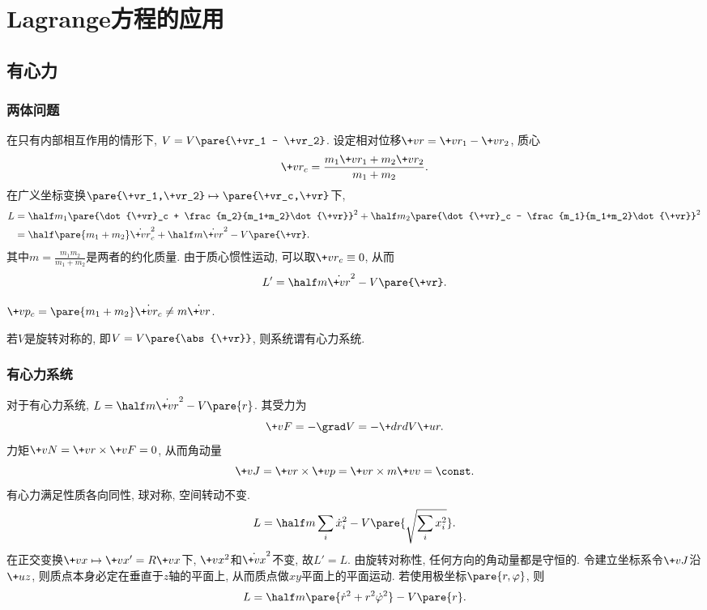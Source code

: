 \documentclass{ctexart}
\begin{document}
\section{Lagrange方程的应用} %
\label{sec:lagrange方程的应用}

\subsection{有心力} %
\label{sub:有心力}

\subsubsection{两体问题} %
\label{ssub:两体问题}

\begin{figure}[ht]
    \centering
\end{figure}
在只有内部相互作用的情形下, $V = V\pare{\+vr_1 - \+vr_2}$. 设定相对位移$\+vr = \+vr_1 - \+vr_2$, 质心
\[ \+vr_c = \frac{m_1\+vr_1 + m_2\+vr_2}{m_1+m_2}. \]
在广义坐标变换$\pare{\+vr_1,\+vr_2}\mapsto \pare{\+vr_c,\+vr}$下,
\begin{align*}
    L &= \half m_1\pare{\dot{\+vr}_c + \frac{m_2}{m_1+m_2}\dot{\+vr}}^2 + \half m_2 \pare{\dot{\+vr}_c - \frac{m_1}{m_1+m_2}\dot{\+vr}}^2 \\
    &= \half\pare{m_1+m_2}\dot{\+vr}_c^2 + \half m\dot{\+vr}^2 - V\pare{\+vr}.
\end{align*}
其中$\displaystyle m = \frac{m_1m_2}{m_1+m_2}$是两者的约化质量. 由于质心惯性运动, 可以取$\+vr_c \equiv 0$, 从而
\[ L' = \half m\dot{\+vr}^2 - V\pare{\+vr}. \]
\begin{remark}
    $\+vp_c = \pare{m_1+m_2}\dot{\+vr_c} \neq m\dot{\+vr}$.
\end{remark}
若$V$是旋转对称的, 即$V = V\pare{\abs{\+vr}}$, 则系统谓有心力系统.


\subsubsection{有心力系统} %
\label{ssub:有心力系统}

对于有心力系统, $\displaystyle L = \half m\dot{\+vr}^2 - V\pare{r}$. 其受力为
\[ \+vF = -\grad V = -\+drdV \+ur. \]
力矩$\+vN = \+vr\times\+vF = 0$, 从而角动量
\[ \+vJ = \+vr\times\+vp = \+vr\times m\+vv = \const. \]
有心力满足性质各向同性, 球对称, 空间转动不变.
\[ L = \half m \sum_i \dot{x}_i^2 - V\pare{\sqrt{\sum_i x_i^2}}. \]
在正交变换$\+vx \mapsto \+vx' = R\+vx$下, $\+vx^2$和$\dot{\+vx}^2$不变, 故$L'=L$. 由旋转对称性, 任何方向的角动量都是守恒的. 令建立坐标系令$\+vJ$沿$\+uz$, 则质点本身必定在垂直于$z$轴的平面上, 从而质点做$xy$平面上的平面运动. 若使用极坐标$\pare{r,\varphi}$, 则
\[ L = \half m\pare{\dot{r}^2 + r^2 \dot{\varphi}^2} - V\pare{r}. \]
\end{document}
